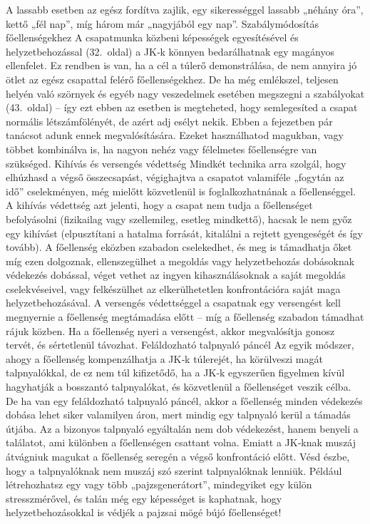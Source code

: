 \documentclass[oneside]{book}
\newcommand{\page}[1]{#1.~oldal}
\begin{document}
A lassabb esetben az egész fordítva zajlik, egy sikerességgel lassabb „néhány óra”, kettő „fél nap”, míg három már „nagyjából egy nap”.
Szabálymódosítás főellenségekhez
A csapatmunka közbeni képességek egyesítésével és helyzetbehozással (\page{32}) a JK‑k könnyen bedarálhatnak egy magányos ellenfelet. Ez rendben is van, ha a cél a túlerő demonstrálása, de nem annyira jó ötlet az egész csapattal felérő főellenségekhez.
De ha még emlékszel, teljesen helyén való szörnyek és egyéb nagy veszedelmek esetében megszegni a szabályokat (\page{43}) – így ezt ebben az esetben is megteheted, hogy semlegesíted a csapat normális létszámfölényét, de azért adj esélyt nekik. Ebben a fejezetben pár tanácsot adunk ennek megvalósítására. Ezeket használhatod magukban, vagy többet kombinálva is, ha nagyon nehéz vagy félelmetes főellenségre van szükséged.
Kihívás és versengés védettség
Mindkét technika arra szolgál, hogy elhúzhasd a végső összecsapást, végighajtva a csapatot valamiféle „fogytán az idő” cselekményen, még mielőtt közvetlenül is foglalkozhatnának a főellenséggel.
A kihívás védettség azt jelenti, hogy a csapat nem tudja a főellenséget befolyásolni (fizikailag vagy szellemileg, esetleg mindkettő), hacsak le nem győz egy kihívást (elpusztítani a hatalma forrását, kitalálni a rejtett gyengeségét és így tovább). A főellenség eközben szabadon cselekedhet, és meg is támadhatja őket míg ezen dolgoznak, ellenszegülhet a megoldás vagy helyzetbehozás dobásoknak védekezés dobással, véget vethet az ingyen kihasználásoknak a saját megoldás cselekvéseivel, vagy felkészülhet az elkerülhetetlen konfrontációra saját maga helyzetbehozásával.
A versengés védettséggel a csapatnak egy versengést kell megnyernie a főellenség megtámadása előtt – míg a főellenség szabadon támadhat rájuk közben. Ha a főellenség nyeri a versengést, akkor megvalósítja gonosz tervét, és sértetlenül távozhat.
Feláldozható talpnyaló páncél
Az egyik módszer, ahogy a főellenség kompenzálhatja a JK‑k túlerejét, ha körülveszi magát talpnyalókkal, de ez nem túl kifizetődő, ha a JK‑k egyszerűen figyelmen kívül hagyhatják a bosszantó talpnyalókat, és közvetlenül a főellenséget veszik célba.
De ha van egy feláldozható talpnyaló páncél, akkor a főellenség minden védekezés dobása lehet siker valamilyen áron, mert mindig egy talpnyaló kerül a támadás útjába. Az a bizonyos talpnyaló egyáltalán nem dob védekezést, hanem benyeli a találatot, ami különben a főellenségen csattant volna. Emiatt a JK‑knak muszáj átvágniuk magukat a főellenség seregén a végső konfrontáció előtt.
Vésd észbe, hogy a talpnyalóknak nem muszáj szó szerint talpnyalóknak lenniük. Például létrehozhatsz egy vagy több „pajzsgenerátort”, mindegyiket egy külön stresszmérővel, és talán még egy képességet is kaphatnak, hogy helyzetbehozásokkal is védjék a pajzsai mögé bújó főellenséget!
\end{document}
